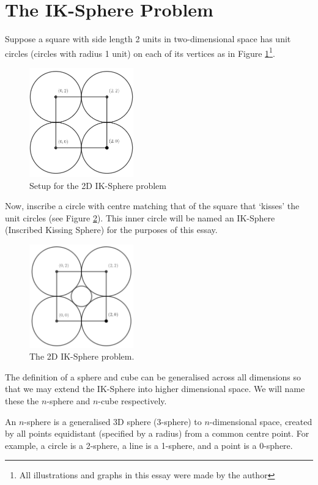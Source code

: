 \section{The IK-Sphere Problem}
Suppose a square with side length 2 units in two-dimensional space has unit circles (circles with radius 1 unit) on each of its vertices as in Figure \ref{fig:2d_Setup_IK_Sphere}\footnote{All illustrations and graphs in this essay were made by the author}.
\begin{figure}[H]
    \centering
    \includegraphics[width=0.4\textwidth]{images/2D.png}
    \caption{\label{fig:2d_Setup_IK_Sphere}Setup for the 2D IK-Sphere problem}
\end{figure}
Now, inscribe a circle with centre matching that of the square that `kisses' the unit circles (see Figure \ref{fig:2d_IK_Sphere}). This inner circle will be named an IK-Sphere (Inscribed Kissing Sphere) for the purposes of this essay.
\begin{figure}[H]
    \centering
    \includegraphics[width=0.4\textwidth]{images/2D IK.png}
    \caption{\label{fig:2d_IK_Sphere}The 2D IK-Sphere problem.}
\end{figure}
The definition of a sphere and cube can be generalised across all dimensions so that we may extend the IK-Sphere into higher dimensional space. We will name these the $n$-sphere and $n$-cube respectively.

\begin{definition}[$n$-Sphere]\label{def:n-sphere}
    An $n$-sphere is a generalised 3D sphere (3-sphere) to $n$-dimensional space, created by all points equidistant (specified by a radius) from a common centre point. For example, a circle is a 2-sphere, a line is a 1-sphere, and a point is a 0-sphere.
\end{definition}

